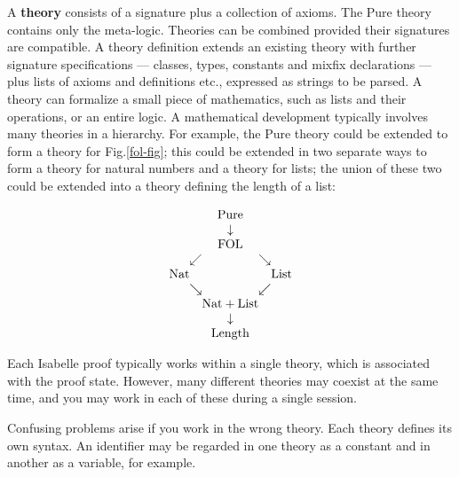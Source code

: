  A {\bf theory} consists of a signature plus a collection
of axioms.  The Pure theory contains only the meta-logic.  Theories can be
combined provided their signatures are compatible.  A theory definition
extends an existing theory with further signature specifications --- classes,
types, constants and mixfix declarations --- plus lists of axioms and
definitions etc., expressed as strings to be parsed.  A theory can formalize a
small piece of mathematics, such as lists and their operations, or an entire
logic.  A mathematical development typically involves many theories in a
hierarchy.  For example, the Pure theory could be extended to form a theory
for Fig.\ts\ref{fol-fig}; this could be extended in two separate ways to form
a theory for natural numbers and a theory for lists; the union of these two
could be extended into a theory defining the length of a list:
\begin{tt}
\[
\begin{array}{c@{}c@{}c@{}c@{}c}
     {}   &     {}   &\hbox{Pure}&     {}  &     {}  \\
     {}   &     {}   &  \downarrow &     {}   &     {}   \\
     {}   &     {}   &\hbox{FOL} &     {}   &     {}   \\
     {}   & \swarrow &     {}    & \searrow &     {}   \\
 \hbox{Nat} &   {}   &     {}    &     {}   & \hbox{List} \\
     {}   & \searrow &     {}    & \swarrow &     {}   \\
     {}   &     {} &\hbox{Nat}+\hbox{List}&  {}   &     {}   \\
     {}   &     {}   &  \downarrow &     {}   &     {}   \\
     {}   &     {} & \hbox{Length} &  {}   &     {}
\end{array}
\]
\end{tt}%
Each Isabelle proof typically works within a single theory, which is
associated with the proof state.  However, many different theories may
coexist at the same time, and you may work in each of these during a single
session.  

\begin{warn}%
  Confusing problems arise if you work in the wrong theory.  Each theory
  defines its own syntax.  An identifier may be regarded in one theory as a
  constant and in another as a variable, for example.
\end{warn}

